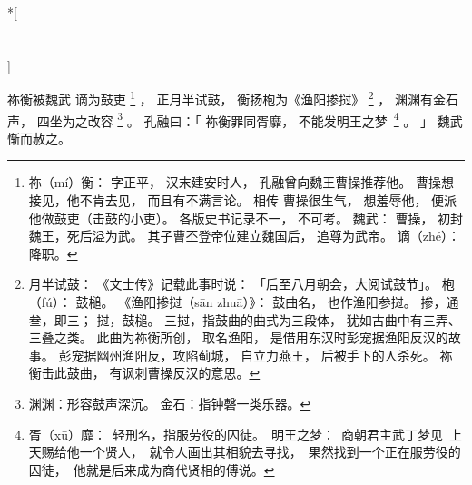 
\switchcolumn[0]*[\section{}]

祢衡被魏武
谪为鼓吏%
\footnote{%
    祢（mí）衡：
        字正平，
        汉末建安时人，
        孔融曾向魏王曹操推荐他。
        曹操想接见，他不肯去见，
        而且有不满言论。
        相传
        曹操很生气，
        想羞辱他，
        便派他做鼓吏（击鼓的小吏）。
        各版史书记录不一，
        不可考。
    魏武：
        曹操，
        初封魏王，死后溢为武。
        其子曹丕登帝位建立魏国后，
        追尊为武帝。
    谪（zhé）：降职。
}%
，
正月半试鼓，
衡扬枹为《渔阳掺挝》%
\footnote{%
    月半试鼓：
        《文士传》记载此事时说：
        「后至八月朝会，大阅试鼓节」。
    枹（fú）：
        鼓槌。
    《渔阳掺挝（sān zhuā）》：
        鼓曲名，
        也作渔阳参挝。
        掺，通叁，即三；
        挝，鼓槌。
        三挝，指鼓曲的曲式为三段体，
        犹如古曲中有三弄、三叠之类。
        此曲为祢衡所创，
        取名渔阳，
        是借用东汉时彭宠据渔阳反汉的故事。
        彭宠据幽州渔阳反，攻陷蓟城，
        自立力燕王，
        后被手下的人杀死。
        祢衡击此鼓曲，
        有讽刺曹操反汉的意思。
}%
，
渊渊有金石声，
四坐为之改容%
\footnote{%
    渊渊：形容鼓声深沉。
    金石：指钟磬一类乐器。
}%
。
孔融曰：「
    祢衡罪同胥靡，
    不能发明王之\mbox{梦%
    \footnote{%
        胥（xū）靡：
            轻刑名，指服劳役的囚徒。
        明王之梦：
            商朝君主武丁梦见
            上天赐给他一个贤人，
            就令人画出其相貌去寻找，
            果然找到一个正在服劳役的囚徒，
            他就是后来成为商代贤相的傅说。
    }}%
    。
」
魏武惭而赦之。

\switchcolumn



